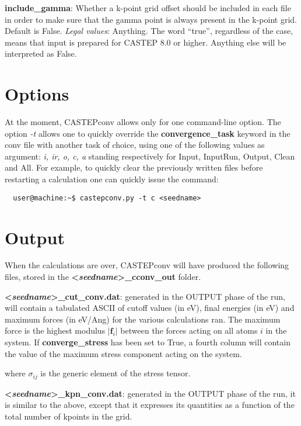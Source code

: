 \documentclass[10pt]{article}
\begin{document}
\textbf{include\_gamma}: Whether a k-point grid offset should be included in each file in order to make sure that the gamma point is always present in the k-point grid. Default is False.\newline
\textit{Legal values}: Anything. The word ``true'', regardless of the case, 
means that input is prepared for CASTEP 8.0 or higher. Anything else will be interpreted as 
False.\newline

\section{Options}

At the moment, CASTEPconv allows only for one command-line option. The option \textit{-t} allows one to quickly override the \textbf{convergence\_task} keyword in the conv file with another task of choice, using one of the following values as argument: \textit{i, ir, o, c, a} standing respectively for Input, InputRun, Output, Clean and All. For example, to quickly clear the previously written files before restarting a calculation one can quickly issue the command:

\begin{lstlisting}
  user@machine:~$ castepconv.py -t c <seedname>
\end{lstlisting}

\section{Output}

When the calculations are over, CASTEPconv will have produced the following 
files, stored in the \textbf{\textless \textit{seedname}\textgreater\_cconv\_out}
folder.

\textbf{\textless \textit{seedname}\textgreater\_cut\_conv.dat}: generated in 
the OUTPUT phase of the run, will contain a tabulated ASCII of cutoff values (in 
eV), final energies (in eV) and maximum forces (in eV/Ang) for the various 
calculations ran. The maximum force is the highest modulus $|\mathbf{f}_i|$ 
between the forces acting on all atoms $i$ in the system. If 
\textbf{converge\_stress} has been set to True, a fourth column will contain the 
value of the maximum stress component acting on the system.

where $\sigma_{ij}$ is the generic element of the stress tensor.

\textbf{\textless \textit{seedname}\textgreater\_kpn\_conv.dat}: generated in 
the OUTPUT phase of the run, it is similar to the above, except that it 
expresses its quantities as a function of the total number of kpoints in the 
grid.
\end{document}
